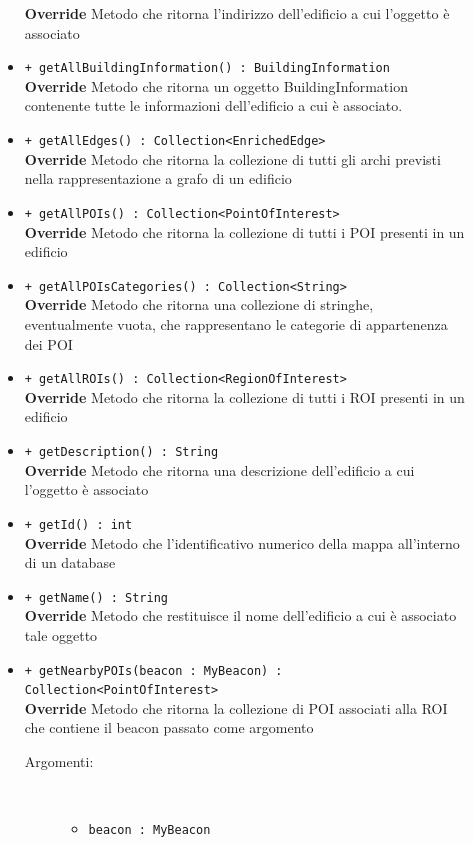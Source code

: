 \documentclass[../DefinizioneDiProdotto.tex]{subfiles}
\begin{document}
\begin{description}
\begin{itemize}
		\textbf{Override} Metodo che ritorna l'indirizzo dell'edificio a cui l'oggetto è associato
		\item \texttt{+ getAllBuildingInformation() : BuildingInformation}\\
		\textbf{Override} Metodo che ritorna un oggetto BuildingInformation contenente tutte le informazioni dell'edificio a cui è associato.
		\item \texttt{+ getAllEdges() : Collection<EnrichedEdge>}\\
		\textbf{Override} Metodo che ritorna la collezione di tutti gli archi previsti nella rappresentazione a grafo di un edificio
		\item \texttt{+ getAllPOIs() : Collection<PointOfInterest>}\\
		\textbf{Override} Metodo che ritorna la collezione di tutti i POI presenti in un edificio
		\item \texttt{+ getAllPOIsCategories() : Collection<String>}\\
		\textbf{Override} Metodo che ritorna una collezione di stringhe, eventualmente vuota, che rappresentano le categorie di appartenenza dei POI
		\item \texttt{+ getAllROIs() : Collection<RegionOfInterest>}\\
		\textbf{Override} Metodo che ritorna la collezione di tutti i ROI presenti in un edificio
		\item \texttt{+ getDescription() : String}\\
		\textbf{Override} Metodo che ritorna una descrizione dell'edificio a cui l'oggetto è associato
		\item \texttt{+ getId() : int}\\
		\textbf{Override} Metodo che l'identificativo numerico della mappa all'interno di un database
		\item \texttt{+ getName() : String}\\
		\textbf{Override} Metodo che restituisce il nome dell'edificio a cui è associato tale oggetto
		\item \texttt{+ getNearbyPOIs(beacon : MyBeacon) : Collection<PointOfInterest>}\\
		\textbf{Override} Metodo che ritorna la collezione di POI associati alla ROI che contiene il beacon passato come argomento
		\begin{description}
			\item[Argomenti:] \
			\begin{itemize}
				\item \texttt{beacon : MyBeacon}\\

\end{itemize}
\end{description}
\end{itemize}
\end{description}
\end{document}
